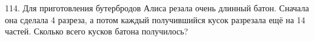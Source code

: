 114. Для приготовления бутербродов Алиса резала очень длинный батон. Сначала она сделала 4 разреза, а потом каждый получившийся кусок разрезала ещё на 14 частей. Сколько всего кусков батона получилось?\\
